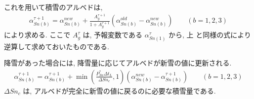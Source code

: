 これを用いて積雪のアルベドは,
\begin{eqnarray}
 \alpha_{Sn(b)}^{\tau+1} = \alpha_{Sn(b)}^{new} + \frac{A_g^{\tau+1}}{1+A_g^{\tau+1}} (\alpha_{Sn(b)}^{old} - \alpha_{Sn(b)}^{new}) \qquad (b=1,2,3)
\end{eqnarray}
により求める.
ここで $A_g^{\tau}$ は, 予報変数である $\alpha_{Sn(1)}^{\tau}$ から, 上
と同様の式により逆算して求めておいたものである.

降雪があった場合には, 降雪量に応じてアルベドが新雪の値に更新される.
\begin{eqnarray}
 \alpha_{Sn(b)}^{\tau+1} = \alpha_{Sn(b)}^{\tau+1}
+ \min\left( \frac{P_{Sn}^* \Delta t_L}{\Delta{Sn_c}}, 1 \right) (\alpha_{Sn(b)}^{new} - \alpha_{Sn(b)}^{\tau+1}) \qquad (b=1,2,3)
\end{eqnarray}
$\Delta {Sn_c}$ は, アルベドが完全に新雪の値に戻るのに必要な積雪量である. 
